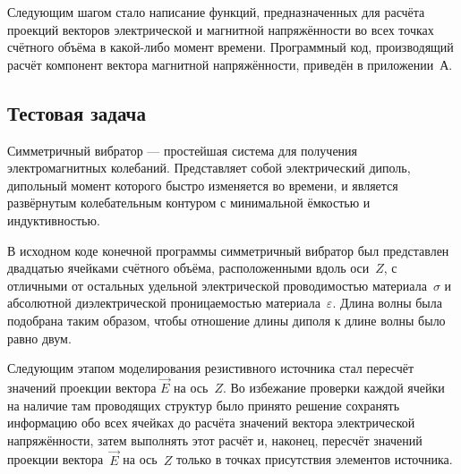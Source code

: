 Следующим шагом стало написание функций, предназначенных для расчёта проекций векторов электрической и магнитной напряжённости во всех точках счётного объёма в какой-либо момент времени. Программный код, производящий расчёт компонент вектора магнитной напряжённости, приведён в приложении~А.

\subsection{Тестовая задача}

Симметричный вибратор --- простейшая система для получения электромагнитных колебаний. Представляет собой электрический диполь, дипольный момент которого быстро изменяется во времени, и является развёрнутым колебательным контуром с минимальной ёмкостью и индуктивностью.

В исходном коде конечной программы симметричный вибратор был представлен двадцатью ячейками счётного объёма, расположенными вдоль оси~$ Z $, с отличными от остальных удельной электрической проводимостью материала~$\sigma$
и абсолютной диэлектрической проницаемостью материала~$\varepsilon$. Длина волны была подобрана таким образом, чтобы отношение длины диполя к длине волны было равно двум.


Следующим этапом моделирования резистивного источника стал пересчёт
значений проекции вектора $ \vec{E} $ на ось~$ Z $. Во избежание проверки каждой ячейки на наличие там проводящих структур было принято решение сохранять информацию обо всех ячейках до расчёта значений вектора электрической напряжённости, затем выполнять этот расчёт и, наконец, пересчёт значений проекции
вектора~$ \vec{E} $ на ось~$ Z $ только в точках присутствия элементов источника.

